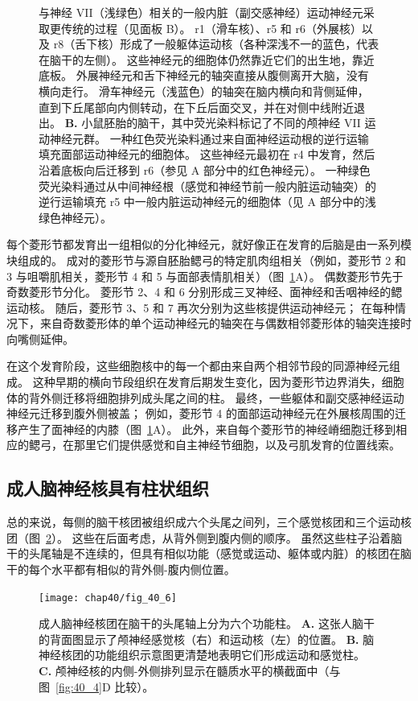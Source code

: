 \begin{figure}[htbp]
{		与神经 VII（浅绿色）相关的一般内脏（副交感神经）运动神经元采取更传统的过程（见面板 B）。
		r1（滑车核）、r5 和 r6（外展核）以及 r8（舌下核）形成了一般躯体运动核（各种深浅不一的蓝色，代表在脑干的左侧）。
		这些神经元的细胞体仍然靠近它们的出生地，靠近底板。
		外展神经元和舌下神经元的轴突直接从腹侧离开大脑，没有横向走行。
		滑车神经元（浅蓝色）的轴突在脑内横向和背侧延伸，直到下丘尾部向内侧转动，在下丘后面交叉，并在对侧中线附近退出。
		\textbf{B.} 小鼠胚胎的脑干，其中荧光染料标记了不同的颅神经 VII 运动神经元群。
		一种红色荧光染料通过来自面神经运动根的逆行运输填充面部运动神经元的细胞体。
		这些神经元最初在 r4 中发育，然后沿着底板向后迁移到 r6（参见 A 部分中的红色神经元）。
		一种绿色荧光染料通过从中间神经根（感觉和神经节前一般内脏运动轴突）的逆行运输填充 r5 中一般内脏运动神经元的细胞体（见 A 部分中的浅绿色神经元）。}
	\label{fig:40_5}
\end{figure}


每个菱形节都发育出一组相似的分化神经元，就好像正在发育的后脑是由一系列模块组成的。
成对的菱形节与源自胚胎鳃弓的特定肌肉组相关（例如，菱形节 2 和 3 与咀嚼肌相关，菱形节 4 和 5 与面部表情肌相关）（图~\ref{fig:40_5}A）。
偶数菱形节先于奇数菱形节分化。
菱形节 2、4 和 6 分别形成三叉神经、面神经和舌咽神经的鳃运动核。
随后，菱形节 3、5 和 7 再次分别为这些核提供运动神经元；
在每种情况下，来自奇数菱形体的单个运动神经元的轴突在与偶数相邻菱形体的轴突连接时向嘴侧延伸。


在这个发育阶段，这些细胞核中的每一个都由来自两个相邻节段的同源神经元组成。
这种早期的横向节段组织在发育后期发生变化，因为菱形节边界消失，细胞体的背外侧迁移将细胞排列成头尾之间的柱。
最终，一些躯体和副交感神经运动神经元迁移到腹外侧被盖；
例如，菱形节 4 的面部运动神经元在外展核周围的迁移产生了面神经的内膝（图~\ref{fig:40_5}A）。
此外，来自每个菱形节的神经嵴细胞迁移到相应的鳃弓，在那里它们提供感觉和自主神经节细胞，以及弓肌发育的位置线索。



\subsection{成人脑神经核具有柱状组织}

总的来说，每侧的脑干核团被组织成六个头尾之间列，三个感觉核团和三个运动核团（图~\ref{fig:40_6}）。
这些在后面考虑，从背外侧到腹内侧的顺序。
虽然这些柱子沿着脑干的头尾轴是不连续的，但具有相似功能（感觉或运动、躯体或内脏）的核团在脑干的每个水平都有相似的背外侧-腹内侧位置。


\begin{figure}[htbp]
	\centering
	\texttt{[image: chap40/fig\_40\_6]}
	\caption{成人脑神经核团在脑干的头尾轴上分为六个功能柱。
		\textbf{A.} 这张人脑干的背面图显示了颅神经感觉核（右）和运动核（左）的位置。
		\textbf{B.} 脑神经核团的功能组织示意图更清楚地表明它们形成运动和感觉柱。
		\textbf{C.} 颅神经核的内侧-外侧排列显示在髓质水平的横截面中（与图~\ref{fig:40_4}D 比较）。}
	\label{fig:40_6}
\end{figure}


